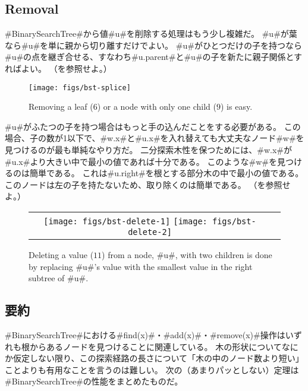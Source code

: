 \subsection{Removal}

#BinarySearchTree#から値#u#を削除する処理はもう少し複雑だ。
#u#が葉なら#u#を単に親から切り離すだけでよい。
#u#がひとつだけの子を持つなら#u#の点を継ぎ合せる、すなわち#u.parent#と#u#の子を新たに親子関係とすればよい。
（を参照せよ。）

\begin{figure}
  \begin{center}
    \texttt{[image: figs/bst-splice]}
  \end{center}
  \caption{Removing a leaf ($6$) or a node with only one child ($9$) is easy.}
\end{figure}

#u#がふたつの子を持つ場合はもっと手の込んだことをする必要がある。
この場合、子の数が1以下で、#w.x#と#u.x#を入れ替えても大丈夫なノード#w#を見つけるのが最も単純なやり方だ。
二分探索木性を保つためには、#w.x#が#u.x#より大きい中で最小の値であれば十分である。
このような#w#を見つけるのは簡単である。
これは#u.right#を根とする部分木の中で最小の値である。
このノードは左の子を持たないため、取り除くのは簡単である。
（を参照せよ。）

\begin{figure}
  \begin{center}
    \begin{tabular}{cc}
    \texttt{[image: figs/bst-delete-1]}
    \texttt{[image: figs/bst-delete-2]}
    \end{tabular}
  \end{center}
  \caption[Deleting from a BinarySearchTree]{Deleting a value ($11$) from a node, #u#, with two children is done by replacing #u#'s value with the smallest value in the right subtree of #u#.}
\end{figure}

\subsection{要約}

#BinarySearchTree#における#find(x)#・#add(x)#・#remove(x)#操作はいずれも根からあるノードを見つけることに関連している。
木の形状についてなにか仮定しない限り、この探索経路の長さについて「木の中のノード数より短い」ことよりも有用なことを言うのは難しい。
次の（あまりパッとしない）定理は#BinarySearchTree#の性能をまとめたものだ。

